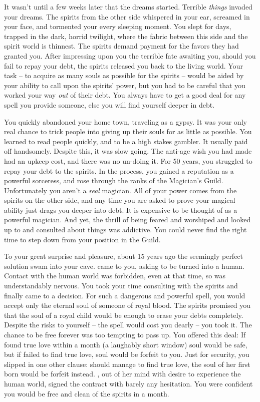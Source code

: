 \documentclass[char]{NeptuneBall}
\begin{document}
It wasn't until a few weeks later that the dreams started. Terrible \emph{things} invaded your dreams. The spirits from the other side whispered in your ear, screamed in your face, and tormented your every sleeping moment. You slept for days, trapped in the dark, horrid twilight, where the fabric between this side and the spirit world is thinnest. The spirits demand payment for the favors they had granted you. After impressing upon you the terrible fate awaiting you, should you fail to repay your debt, the spirits released you back to the living world. Your task -- to acquire as many souls as possible for the spirits -- would be aided by your ability to call upon the spirits' power, but you had to be careful that you worked your way \emph{out} of their debt. You always have to get a good deal for any spell you provide someone, else you will find yourself deeper in debt.

You quickly abandoned your home town, traveling \pAtlantis{} as a gypsy. It was your only real chance to trick people into giving up their souls for as little as possible. You learned to read people quickly, and to be a high stakes gambler. It usually paid off handsomely. Despite this, it was slow going. The anti-age wish you had made had an upkeep cost, and there was no un-doing it. For 50 years, you struggled to repay your debt to the spirits. In the process, you gained a reputation as a powerful sorceress, and rose through the ranks of the Magician's Guild. Unfortunately you aren't a \emph{real} magician. All of your power comes from the spirits on the other side, and any time you are asked to prove your magical ability just drags you deeper into debt. It is expensive to be thought of as a powerful magician. And yet, the thrill of being feared and worshiped and looked up to and consulted about things was addictive. You could never find the right time to step down from your position in the Guild.

To your great surprise and pleasure, about 15 years ago the seemingly perfect solution swam into your cave. \cAriel{\Prince} \cAriel{} came to you, asking to be turned into a human. Contact with the human world was forbidden, even at that time, so \cAriel{} was understandably nervous. You took your time consulting with the spirits and finally came to a decision. For such a dangerous and powerful spell, you would accept only the eternal soul of someone of royal blood. The spirits promised you that the soul of a royal child would be enough to erase your debts completely. Despite the risks to yourself -- the spell would cost you dearly -- you took it. The chance to be free forever was too tempting to pass up. You offered \cAriel{} this deal: If \cAriel{\they} found true love within a month (a laughably short window) \cAriel{\them} soul would be safe, but if \cAriel{} failed to find true love, \cAriel{\them} soul would be forfeit to you. Just for security, you slipped in one other clause: should \cAriel{} manage to find true love, the soul of her first born \cArielsSon{\offspring} would be forfeit instead. \cAriel{}, out of her mind with desire to experience the human world, signed the contract with barely any hesitation. You were confident you would be free and clean of the spirits in a month.
\end{document}
